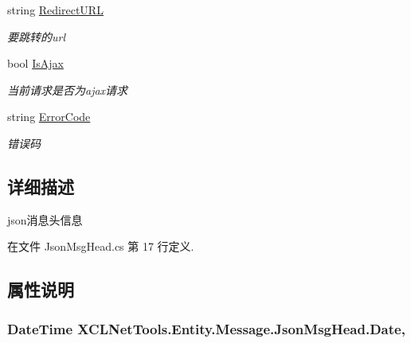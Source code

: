 \begin{DoxyCompactItemize}
string \hyperlink{class_x_c_l_net_tools_1_1_entity_1_1_message_1_1_json_msg_head_aa3e8eb7bf16a7a3abea7e7797488685e}{Redirect\-U\-R\-L}
\begin{DoxyCompactList}\small\item\em 要跳转的url \end{DoxyCompactList}\item 
bool \hyperlink{class_x_c_l_net_tools_1_1_entity_1_1_message_1_1_json_msg_head_adedb9cb59037071c879572360cebc574}{Is\-Ajax}
\begin{DoxyCompactList}\small\item\em 当前请求是否为ajax请求 \end{DoxyCompactList}\item 
string \hyperlink{class_x_c_l_net_tools_1_1_entity_1_1_message_1_1_json_msg_head_a0f5effef61535ac1a2560f9c47eaea17}{Error\-Code}
\begin{DoxyCompactList}\small\item\em 错误码 \end{DoxyCompactList}\end{DoxyCompactItemize}


\subsection{详细描述}
json消息头信息 



在文件 Json\-Msg\-Head.\-cs 第 17 行定义.



\subsection{属性说明}
\hypertarget{class_x_c_l_net_tools_1_1_entity_1_1_message_1_1_json_msg_head_ae57b40b25eb4db28d428134d33358c90}{
\subsubsection[{Date}]{\setlength{\rightskip}{0pt plus 5cm}Date\-Time X\-C\-L\-Net\-Tools.\-Entity.\-Message.\-Json\-Msg\-Head.\-Date\hspace{0.3cm}{\ttfamily [get]}, {\ttfamily [set]}}}\label{class_x_c_l_net_tools_1_1_entity_1_1_message_1_1_json_msg_head_ae57b40b25eb4db28d428134d33358c90}


